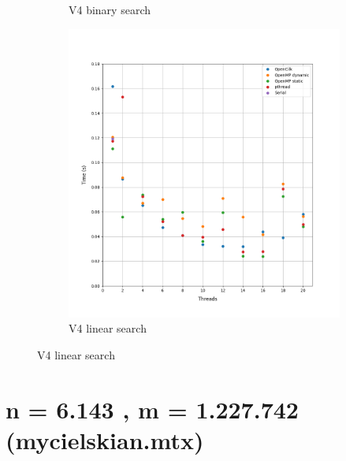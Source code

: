 \documentclass[12pt, a4paper]{article}
\begin{document}
\begin{figure}[h!]
\begin{subfigure}[b]{0.33\textwidth}
         \caption{V4 binary search}
     \end{subfigure}
     \begin{subfigure}[b]{0.33\textwidth}
         \centering
         \includegraphics[height=.4\textheight, width=\textwidth, keepaspectratio]{assets/dblp/v4_linear.png}
         \caption{V4 linear search} 
     \end{subfigure}
\end{figure}

\section{n = 6.143 , m = 1.227.742 (mycielskian.mtx)}
\end{document}
